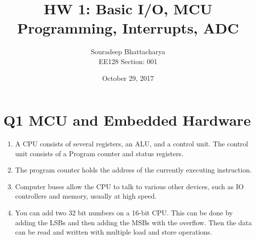 \documentclass{article}
\title{HW 1: Basic I/O, MCU Programming, Interrupts, ADC}
\date{October 29, 2017}
\author{Souradeep Bhattacharya \\ EE128 Section: 001}
\begin{document}
	\maketitle
	 
	\section*{Q1 MCU and Embedded Hardware}
	\begin{enumerate}
		\item A CPU consists of several registers, an ALU, and a control unit. The control unit consists of a Program counter and status registers.
		\item The program counter holds the address of the currently executing instruction.
		\item Computer buses allow the CPU to talk to various other devices, such as IO controllers and memory, usually at high speed.
		\item You can add two 32 bit numbers on a 16-bit CPU. This can be done by adding the LSBs and then adding the MSBs with the overflow. Then the data can be read and written with multiple load and store operations.
	\end{enumerate}
\end{document}
